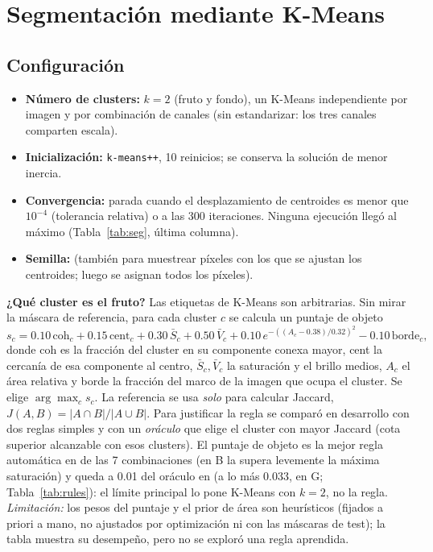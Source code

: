 \documentclass[11pt,a4paper]{article}
\begin{document}
\section{Segmentación mediante K-Means}

\subsection{Configuración}

\begin{itemize}[leftmargin=1.4em,itemsep=1pt]
\item \textbf{Número de clusters:} $k=2$ (fruto y fondo), un K-Means independiente por
imagen y por combinación de canales (sin estandarizar: los tres canales comparten escala).
\item \textbf{Inicialización:} \texttt{k-means++}, 10 reinicios; se conserva la solución de
menor inercia.
\item \textbf{Convergencia:} parada cuando el desplazamiento de centroides es menor que
$10^{-4}$ (tolerancia relativa) o a las 300 iteraciones. Ninguna ejecución llegó al
máximo (Tabla~\ref{tab:seg}, última columna).
\item \textbf{Semilla:} \Seed{} (también para muestrear \PixelSample{} píxeles con los que se
ajustan los centroides; luego se asignan todos los píxeles).
\end{itemize}

\textbf{¿Qué cluster es el fruto?} Las etiquetas de K-Means son arbitrarias. Sin mirar la
máscara de referencia, para cada cluster $c$ se calcula un puntaje de objeto
\[
s_c = 0.10\,\text{coh}_c + 0.15\,\text{cent}_c + 0.30\,\bar S_c + 0.50\,\bar V_c
      + 0.10\,e^{-((A_c-0.38)/0.32)^2} - 0.10\,\text{borde}_c ,
\]
donde coh es la fracción del cluster en su componente conexa mayor, cent la cercanía de
esa componente al centro, $\bar S_c,\bar V_c$ la saturación y el brillo medios, $A_c$ el área
relativa y borde la fracción del marco de la imagen que ocupa el cluster. Se elige
$\arg\max_c s_c$. La referencia se usa \emph{solo} para calcular Jaccard,
$J(A,B)=|A\cap B|/|A\cup B|$. Para justificar la regla se comparó en desarrollo con dos reglas
simples y con un \emph{oráculo} que elige el cluster con mayor Jaccard (cota superior
alcanzable con esos clusters). El puntaje de objeto es la mejor regla automática en
\HeurBestCount{} de las 7 combinaciones (en B la supera levemente la máxima saturación) y queda a
0.01 del oráculo en \BestCombo{} (a lo más 0.033, en G; Tabla~\ref{tab:rules}): el límite principal lo pone K-Means con $k=2$, no la regla.
\emph{Limitación:} los pesos del puntaje y el prior de área son heurísticos (fijados a priori
a mano, no ajustados por optimización ni con las máscaras de test); la tabla muestra su desempeño, pero no se exploró una regla aprendida.
\end{document}
